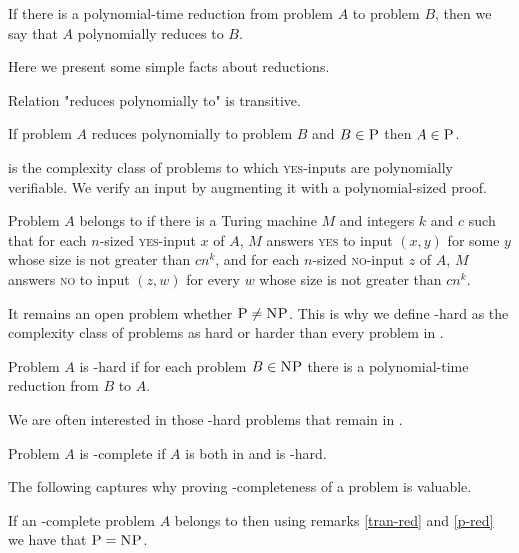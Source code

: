 If there is a polynomial-time reduction from problem $A$ to problem $B$,
then we say that $A$ polynomially reduces to $B$.

Here we present some simple facts about reductions.

\begin{rmrk}\label{tran-red}
Relation "reduces polynomially to" is transitive.
\end{rmrk}

\begin{rmrk}\label{p-red}
If problem $A$ reduces polynomially to problem $B$ and $B \in \text{\textsc{P}}$ then $A \in \text{\textsc{P}}$.
\end{rmrk}

\np is the complexity class of problems to which \textsc{yes}-inputs are polynomially verifiable.
We verify an input by augmenting it with a polynomial-sized proof.

\begin{defn}[\np]
Problem $A$ belongs to \np if there is a Turing machine $M$ and integers $k$ and $c$ such that
for each $n$-sized \textsc{yes}-input $x$ of $A$,
$M$ answers \textsc{yes} to input $(x,y)$ for some $y$ whose size is not greater than $c n^k$,
and for each $n$-sized \textsc{no}-input $z$ of $A$,
$M$ answers \textsc{no} to input $(z,w)$ for every $w$ whose size is not greater than $c n^k$.
\end{defn}

It remains an open problem whether $\text{\textsc{P}}\neq\text{\textsc{NP}}$.
This is why we define \np-hard as the complexity class of problems as hard or harder than every problem in \np.

\begin{defn}[\np-hard]
Problem $A$ is \np-hard if for each problem $B \in \text{\textsc{NP}}$
there is a polynomial-time reduction from $B$ to $A$.
\end{defn}

We are often interested in those \np-hard problems that remain in \np.

\begin{defn}[\np-complete]
Problem $A$ is \np-complete if $A$ is both in \np and is \np-hard.
\end{defn}

The following captures why proving \np-completeness of a problem is valuable.

\begin{rmrk}
If an \np-complete problem $A$ belongs to \p then using remarks \ref{tran-red} and \ref{p-red}
we have that $\text{\textsc{P}} = \text{\textsc{NP}}$.
\end{rmrk}

